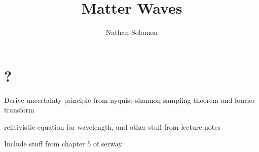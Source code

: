 \documentclass[12pt]{article}
\begin{document}
\title{Matter Waves}
\author{Nathan Solomon}
\maketitle

\section{?}

Derive uncertainty principle from nyquist-shannon sampling theorem and fourier transform

relitivistic equation for wavelength, and other stuff from lecture notes

Include stuff from chapter 5 of serway
\end{document}
